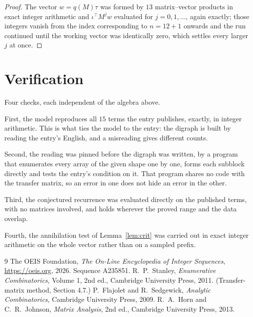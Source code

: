 \documentclass[11pt,a4paper]{article}
\theoremstyle{plain}
\theoremstyle{definition}
\begin{document}
\begin{proof}
The vector $w=q(M)\tau$ was formed by $13$ matrix--vector products in exact integer
arithmetic and $\iota^{\!\top}M^{j}w$ evaluated for $j=0,1,\dots$, again exactly; those
integers vanish from the index corresponding to $n=12+1$ onwards and the run continued
until the working vector was identically zero, which settles every larger $j$ at once.
\end{proof}

\section{Verification}

Four checks, each independent of the algebra above.

First, the model reproduces all $15$ terms the entry publishes, exactly, in integer
arithmetic. This is what ties the model to the entry: the digraph is built by reading the
entry's English, and a misreading gives different counts.

Second, the reading was pinned before the digraph was written, by a program that enumerates
every array of the given shape one by one, forms each subblock directly and tests the entry's
condition on it. That program shares no code with the transfer matrix, so an error in one does
not hide an error in the other.

Third, the conjectured recurrence was evaluated directly on the published terms, with no
matrices involved, and holds wherever the proved range and the data overlap.

Fourth, the annihilation test of Lemma~\ref{lem:crit} was carried out in exact integer
arithmetic on the whole vector rather than on a sampled prefix.

\begin{thebibliography}{9}
 The OEIS Foundation, \emph{The On-Line Encyclopedia of Integer
Sequences}, \url{https://oeis.org}, 2026. Sequence A235851.
 R.~P.~Stanley, \emph{Enumerative Combinatorics}, Volume 1, 2nd ed.,
Cambridge University Press, 2011. (Transfer-matrix method, Section 4.7.)
 P.~Flajolet and R.~Sedgewick, \emph{Analytic Combinatorics}, Cambridge
University Press, 2009.
 R.~A.~Horn and C.~R.~Johnson, \emph{Matrix Analysis}, 2nd ed., Cambridge
University Press, 2013.
\end{thebibliography}
\end{document}
